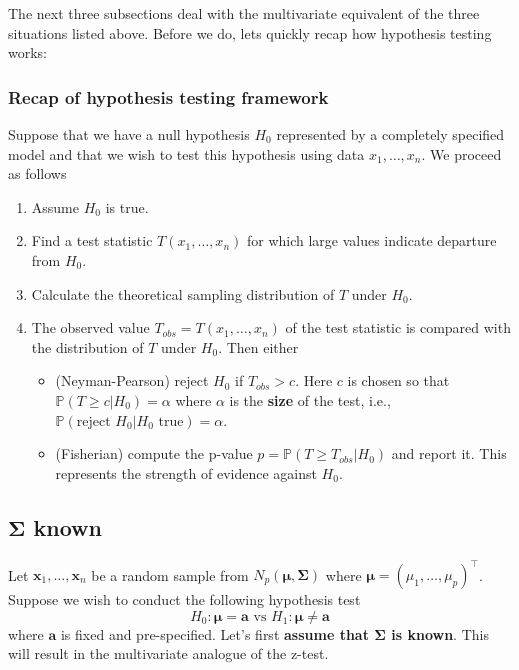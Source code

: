 \documentclass[
]{book}
\providecommand{\tightlist}{%
  \setlength{\itemsep}{0pt}\setlength{\parskip}{0pt}}
\theoremstyle{definition}
\theoremstyle{definition}
\theoremstyle{definition}
\theoremstyle{definition}
\theoremstyle{remark}
\begin{document}
The next three subsections deal with the multivariate equivalent of the three situations listed above. Before we do, lets quickly recap how hypothesis testing works:

\subsubsection*{Recap of hypothesis testing framework}\label{recap-of-hypothesis-testing-framework}

Suppose that we have a null hypothesis \(H_0\) represented by a completely specified model and that we wish to test this hypothesis using data \(x_1, \ldots, x_n\). We proceed as follows

\begin{enumerate}
\def\labelenumi{\arabic{enumi}.}
\item
  Assume \(H_0\) is true.
\item
  Find a test statistic \(T(x_1, \ldots, x_n)\) for which large values indicate departure from \(H_0\).
\item
  Calculate the theoretical sampling distribution of \(T\) under \(H_0\).
\item
  The observed value \(T_{obs}=T(x_1, \ldots, x_n)\) of the test statistic is compared with the distribution of \(T\) under \(H_0\). Then either

  \begin{itemize}
  \tightlist
  \item
    (Neyman-Pearson) reject \(H_0\) if \(T_{obs}>c\). Here \(c\) is chosen so that \(\mathbb{P}(T\geq c| H_0)=\alpha\) where \(\alpha\) is the \textbf{size} of the test, i.e., \(\mathbb{P}(\mbox{reject } H_0 | H_0 \mbox{ true})=\alpha\).
  \item
    (Fisherian) compute the p-value \(p=\mathbb{P}(T\geq T_{obs}|H_0)\) and report it. This represents the strength of evidence against \(H_0\).
  \end{itemize}
\end{enumerate}

\subsection{\texorpdfstring{\(\boldsymbol{\Sigma}\) known}{\textbackslash boldsymbol\{\textbackslash Sigma\} known}}\label{onesampleSigma}

Let \(\mathbf x_1,\ldots,\mathbf x_n\) be a random sample from \(N_p({\boldsymbol{\mu}},\boldsymbol{\Sigma})\) where
\({\boldsymbol{\mu}}= (\mu_1,\ldots,\mu_p)^\top\). Suppose we wish to conduct the following hypothesis test \[H_0: {\boldsymbol{\mu}}= \mathbf a\mbox{ vs } H_1: {\boldsymbol{\mu}}\neq \mathbf a\] where \(\mathbf a\) is fixed and pre-specified.
Let's first \textbf{assume that \(\boldsymbol{\Sigma}\) is known}. This will result in the multivariate analogue of the z-test.
\end{document}
